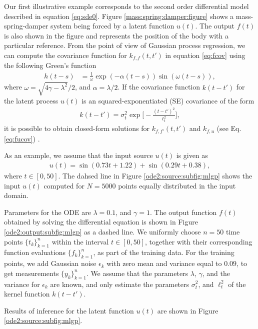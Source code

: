 \documentclass[journal]{IEEEtran}
\begin{document}
Our first illustrative example corresponds to the second order
differential model described in equation \eqref{eq:sde0}. Figure
\ref{mass:spring:damper:figure} shows a mass-spring-damper system
being forced by a latent function $u(t)$. The output $f(t)$ is also
shown in the figure and represents the position of the body with a
particular reference. From the point of view of Gaussian process
regression, we can compute the covariance function for $k_{f,f}(t,t')$
in equation \eqref{eq:fcov} using the following Green's function 
\begin{align}\label{Greens:ODE:2}
h(t-s) & = \frac{1}{\omega}\exp(-\alpha(t-s))\sin(\omega(t-s)),
\end{align} 
where $\omega = \sqrt{4\gamma - \lambda^2}/2$, and $\alpha =
\lambda/2$. 
If the covariance function $k(t-t')$ for the latent process $u(t)$  is an
squared-exponentiated (SE) covariance of the form 
\begin{align*}
k(t -t') = \sigma_t^2\exp\Bigg[-\frac{(t-t')^2}{\ell^2_t}\Bigg],
\end{align*}
it is possible to obtain closed-form solutions for $k_{f,f'}(t,t')$
and $k_{f,u}$ (see Eq. \eqref{eq:fucov})
\cite{Alvarez+Luengo+Lawrence:2009}.
 
As an example, we assume that the input source $u(t)$ is given as
\begin{align*}
u(t) = \sin(0.73t +1.22) + \sin(0.29t + 0.38),
\end{align*}
where $t\in [0,50]$. The dahsed line in Figure \ref{ode2:source:subfig:mlgp}  shows the input $u(t)$ computed for
$N=5000$ points equally distributed in the input domain. 

Parameters for the ODE are $\lambda = 0.1$, and $\gamma = 1$. The output function $f(t)$ obtained by solving the
differential equation is shown in Figure \ref{ode2:output:subfig:mlgp} as a dashed line. 
We uniformly choose $n=50$ time points $\{t_k\}_{k=1}^n$ within the interval $t\in [0,50]$, together with their
corresponding function evaluations $\{f_k\}_{k=1}^n$, as part of the training data. For the training points, we add Gaussian noise
$\epsilon_k$ with zero mean and variance equal to $0.09$, to get
measurements $\{y_k\}_{k=1}^n$. We assume that the parameters
$\lambda$, $\gamma$, and the variance for $\epsilon_k$ are known, and
only estimate the parameters $\sigma_t^2$,
and $\ell^2_t$ of the kernel function $k(t-t')$.

Results of inference for the latent function $u(t)$ are shown in Figure \ref{ode2:source:subfig:mlgp}.
\end{document}
